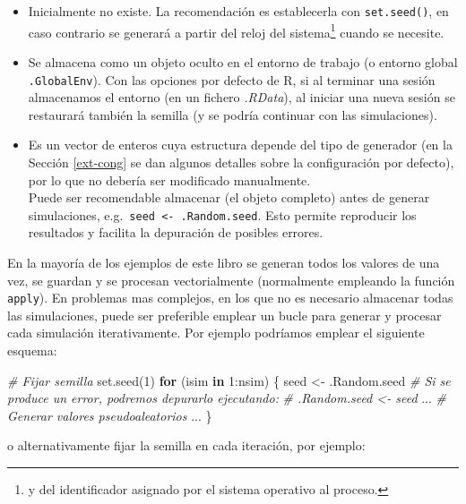 \documentclass[
]{book}
\newenvironment{Shaded}{\begin{snugshade}}{\end{snugshade}}
\newcommand{\CommentTok}[1]{\textcolor[rgb]{0.56,0.35,0.01}{\textit{#1}}}
\newcommand{\ControlFlowTok}[1]{\textcolor[rgb]{0.13,0.29,0.53}{\textbf{#1}}}
\newcommand{\DecValTok}[1]{\textcolor[rgb]{0.00,0.00,0.81}{#1}}
\newcommand{\FunctionTok}[1]{\textcolor[rgb]{0.00,0.00,0.00}{#1}}
\newcommand{\NormalTok}[1]{#1}
\newcommand{\OtherTok}[1]{\textcolor[rgb]{0.56,0.35,0.01}{#1}}
\newcommand{\SpecialCharTok}[1]{\textcolor[rgb]{0.00,0.00,0.00}{#1}}
\theoremstyle{break}
\theoremstyle{nonumberplain}
\begin{document}
\begin{itemize}
\item
  Inicialmente no existe.
  La recomendación es establecerla con \texttt{set.seed()}, en caso contrario se generará a partir del reloj del sistema\footnote{y del identificador asignado por el sistema operativo al proceso.} cuando se necesite.
\item
  Se almacena como un objeto oculto en el entorno de trabajo (o entorno global \texttt{.GlobalEnv}). Con las opciones por defecto de R, si al terminar una sesión almacenamos el entorno (en un fichero \emph{.RData}), al iniciar una nueva sesión se restaurará también la semilla (y se podría continuar con las simulaciones).
\item
  Es un vector de enteros cuya estructura depende del tipo de generador (en la Sección \ref{ext-cong} se dan algunos detalles sobre la configuración por defecto), por lo que no debería ser modificado manualmente.\\
  Puede ser recomendable almacenar (el objeto completo) antes de generar simulaciones, e.g.~\texttt{seed\ \textless{}-\ .Random.seed}. Esto permite reproducir los resultados y facilita la depuración de posibles errores.
\end{itemize}

En la mayoría de los ejemplos de este libro se generan todos los valores de una vez,
se guardan y se procesan vectorialmente (normalmente empleando la función \texttt{apply}).
En problemas mas complejos, en los que no es necesario almacenar todas las simulaciones,
puede ser preferible emplear un bucle para generar y procesar cada simulación iterativamente.
Por ejemplo podríamos emplear el siguiente esquema:

\begin{Shaded}
\begin{Highlighting}[]
\CommentTok{\# Fijar semilla}
\FunctionTok{set.seed}\NormalTok{(}\DecValTok{1}\NormalTok{)}
\ControlFlowTok{for}\NormalTok{ (isim }\ControlFlowTok{in} \DecValTok{1}\SpecialCharTok{:}\NormalTok{nsim) \{}
\NormalTok{  seed }\OtherTok{\textless{}{-}}\NormalTok{ .Random.seed}
  \CommentTok{\# Si se produce un error, podremos depurarlo ejecutando:}
  \CommentTok{\#  .Random.seed \textless{}{-} seed}
\NormalTok{  ...}
  \CommentTok{\# Generar valores pseudoaleatorios}
\NormalTok{  ...}
\NormalTok{\}}
\end{Highlighting}
\end{Shaded}

o alternativamente fijar la semilla en cada iteración, por ejemplo:
\end{document}
